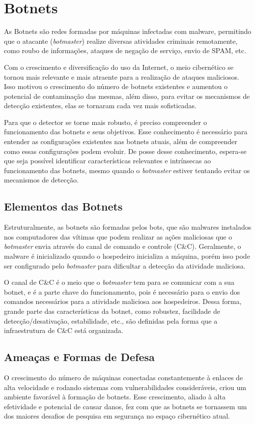 \chapter{Botnets}
As Botnets são redes formadas por máquinas infectadas com malware, permitindo que o atacante (\textit{botmaster}) realize diversas atividades criminais remotamente, como roubo de informações, ataques de negação de serviço, envio de SPAM, etc.\cite{silva2013botnets}

Com o crescimento e diversificação do uso da Internet, o meio cibernético se tornou mais relevante e mais atraente para a realização de ataques maliciosos. Isso motivou o crescimento do número de botnets existentes e aumentou o potencial de contaminação das mesmas, além disso, para evitar os mecanismos de detecção existentes, elas se tornaram cada vez mais sofisticadas.

Para que o detector se torne mais robusto, é preciso compreender o funcionamento das botnets e seus objetivos. Esse conhecimento é necessário para entender as configurações existentes nas botnets atuais, além de compreender como essas configurações podem evoluir. De posse desse conhecimento, espera-se que seja possível identificar características relevantes e intrínsecas ao funcionamento das botnets, mesmo quando o \textit{botmaster} estiver tentando evitar os mecanismos de detecção.

\section{Elementos das Botnets}
Estruturalmente, as botnets são formadas pelos bots, que são malwares instalados nos computadores das vítimas que podem realizar as ações maliciosas que o \textit{botmaster} envia através do canal de comando e controle (C\&C). Geralmente, o malware é inicializado quando o hospedeiro inicializa a máquina, porém isso pode ser configurado pelo \textit{botmaster} para dificultar a detecção da atividade maliciosa.

O canal de C\&C é o meio que o \textit{botmaster} tem para se comunicar com a sua botnet, e é a parte chave do funcionamento, pois é necessário para o envio dos comandos necessários para a atividade maliciosa aos hospedeiros. Dessa forma, grande parte das características da botnet, como robustez, facilidade de detecção/desativação, estabilidade, etc., são definidas pela forma que a infraestrutura de C\&C está organizada.

\section{Ameaças e Formas de Defesa}
O crescimento do número de máquinas conectadas constantemente à enlaces de alta velocidade e rodando sistemas com vulnerabilidades consideráveis, criou um ambiente favorável à formação de botnets. Esse crescimento, aliado à alta efetividade e potencial de causar danos, fez com que as botnets se tornassem um dos maiores desafios de pesquisa em segurança no espaço cibernético atual. \cite{soltani2014survey}

